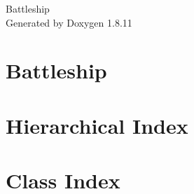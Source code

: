 \documentclass[twoside]{book}
\newcommand{\+}{\discretionary{\mbox{\scriptsize$\hookleftarrow$}}{}{}}
\newcommand{\clearemptydoublepage}{%
  \newpage{\pagestyle{empty}\cleardoublepage}%
}
\begin{document}
\hypersetup{pageanchor=false,
             bookmarksnumbered=true,
             pdfencoding=unicode
            }
\begin{titlepage}
\vspace*{7cm}
\begin{center}%
{\Large Battleship }\\
\vspace*{1cm}
{\large Generated by Doxygen 1.8.11}\\
\end{center}
\end{titlepage}
\clearemptydoublepage
\tableofcontents
\clearemptydoublepage
{}
\hypersetup{pageanchor=true}

\chapter{Battleship}
\label{md_README}
\hypertarget{md_README}{}

\chapter{Hierarchical Index}

\chapter{Class Index}

\end{document}
